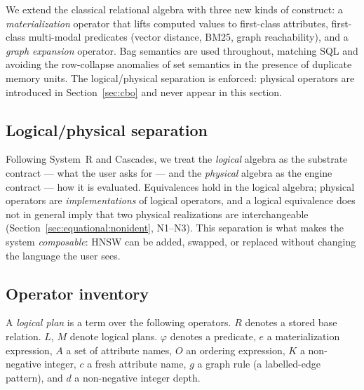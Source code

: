 \documentclass[sigconf,nonacm,review]{acmart}
\theoremstyle{plain}
\theoremstyle{definition}
\theoremstyle{remark}
\begin{document}
We extend the classical relational algebra with three new kinds of
construct: a \emph{materialization} operator that lifts computed
values to first-class attributes, first-class multi-modal predicates
(vector distance, BM25, graph reachability), and a \emph{graph
expansion} operator. Bag semantics are used throughout, matching SQL
and avoiding the row-collapse anomalies of set semantics in the
presence of duplicate memory units. The logical/physical separation
is enforced: physical operators are introduced in
Section~\ref{sec:cbo} and never appear in this section.

\subsection{Logical/physical separation}

Following System~R and Cascades, we treat the \emph{logical} algebra
as the substrate contract --- what the user asks for --- and the
\emph{physical} algebra as the engine contract --- how it is
evaluated. Equivalences hold in the logical algebra; physical
operators are \emph{implementations} of logical operators, and a
logical equivalence does not in general imply that two physical
realizations are interchangeable (Section~\ref{sec:equational:nonident},
N1--N3). This separation is what makes the system \emph{composable}:
HNSW can be added, swapped, or replaced without changing the language
the user sees.

\subsection{Operator inventory}

A \emph{logical plan} is a term over the following operators. $R$
denotes a stored base relation. $L$, $M$ denote logical plans.
$\varphi$ denotes a predicate, $e$ a materialization expression, $A$
a set of attribute names, $O$ an ordering expression, $K$ a
non-negative integer, $c$ a fresh attribute name, $g$ a graph rule
(a labelled-edge pattern), and $d$ a non-negative integer depth.
\end{document}
